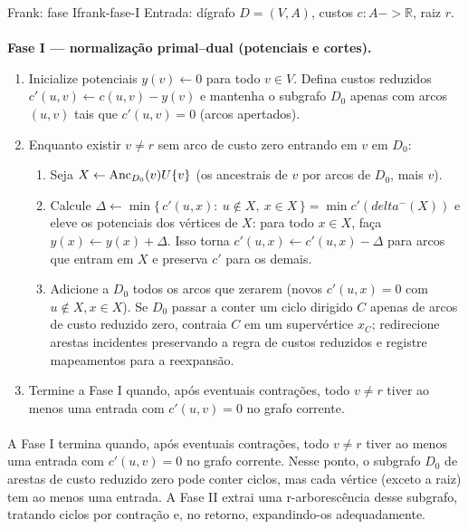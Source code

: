 \documentclass[12pt,a4paper]{article}
\def\emph#1{#1}%
\def\cup{\string U}%
\def\to{->}%
\def\delta{delta}%
\begin{document}
\begin{algobox}{Frank: fase I}{frank-fase-I}
    Entrada: dígrafo \(D=(V,A)\), custos \(c:A\to\mathbb{R}\), raiz \(r\).
    \paragraph{}
    \textbf{Fase I — normalização primal–dual (potenciais e cortes).}
    \begin{enumerate}\setlength{\itemsep}{1pt}
        \item Inicialize potenciais \(y(v)\gets 0\) para todo \(v\in V\). Defina custos reduzidos \(c'(u,v)\gets c(u,v)-y(v)\) e mantenha o subgrafo \(D_0\) apenas com arcos \((u,v)\) tais que \(c'(u,v)=0\) (arcos \emph{apertados}).
        \item Enquanto existir \(v\neq r\) sem arco de custo zero \emph{entrando} em \(v\) em \(D_0\):
              \begin{enumerate}\setlength{\itemsep}{1pt}
                  \item Seja \(X\gets \mathrm{Anc}_{D_0}(v)\cup\{v\}\) (os ancestrais de \(v\) por arcos de \(D_0\), mais \(v\)).
                  \item Calcule \(\Delta\gets\min\{\,c'(u,x):\ u\notin X,\ x\in X\,\}=\min c'(\delta^-(X))\) e \emph{eleve} os potenciais dos vértices de \(X\): para todo \(x\in X\), faça \(y(x)\gets y(x)+\Delta\). Isso torna \(c'(u,x)\gets c'(u,x)-\Delta\) para arcos que entram em \(X\) e preserva \(c'\) para os demais.
                  \item Adicione a \(D_0\) todos os arcos que zerarem (novos \(c'(u,x)=0\) com \(u\notin X, x\in X\)). Se \(D_0\) passar a conter um ciclo dirigido \(C\) apenas de arcos de custo reduzido zero, contraia \(C\) em um supervértice \(x_C\); redirecione arestas incidentes preservando a regra de custos reduzidos e registre mapeamentos para a reexpansão.
              \end{enumerate}
        \item Termine a Fase I quando, após eventuais contrações, todo \(v\neq r\) tiver ao menos uma entrada com \(c'(u,v)=0\) no grafo corrente.
    \end{enumerate}
\end{algobox}

\paragraph{}
A Fase I termina quando, após eventuais contrações, todo \(v\neq r\) tiver ao menos uma entrada com \(c'(u,v)=0\) no grafo corrente. Nesse ponto, o subgrafo \(D_0\) de arestas de custo reduzido zero pode conter ciclos, mas cada vértice (exceto a raiz) tem ao menos uma entrada. A Fase II extrai uma r-arborescência desse subgrafo, tratando ciclos por contração e, no retorno, expandindo-os adequadamente.
\end{document}
